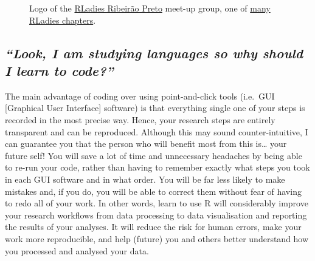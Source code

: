 \documentclass[
  letterpaper,
  DIV=11,
  numbers=noendperiod]{scrreprt}
\begin{document}
\begin{figure}


\caption{\label{fig-RLadies}Logo of the
\href{https://rladiesrp.github.io/}{RLadies Ribeirão Preto} meet-up
group, one of
\href{https://benubah.github.io/r-community-explorer/rladies.html}{many
RLadies chapters}.}

\end{figure}%

\subsection{\texorpdfstring{\emph{``Look, I am studying languages so why
should I learn to
code?''}}{``Look, I am studying languages so why should I learn to code?''}}\label{look-i-am-studying-languages-so-why-should-i-learn-to-code}

The main advantage of coding over using point-and-click tools (i.e.~GUI
{[}Graphical User Interface{]} software) is that everything single one
of your steps is recorded in the most precise way. Hence, your research
steps are entirely transparent and can be reproduced. Although this may
sound counter-intuitive, I can guarantee you that the person who will
benefit most from this is\ldots{} your future self! You will save a lot
of time and unnecessary headaches by being able to re-run your code,
rather than having to remember exactly what steps you took in each GUI
software and in what order. You will be far less likely to make mistakes
and, if you do, you will be able to correct them without fear of having
to redo all of your work. In other words, learn to use R will
considerably improve your research workflows from data processing to
data visualisation and reporting the results of your analyses. It will
reduce the risk for human errors, make your work more reproducible, and
help (future) you and others better understand how you processed and
analysed your data.
\end{document}
